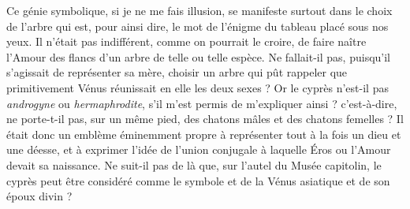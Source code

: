 \documentclass{article}
\begin{document}
Ce génie symbolique, si je ne me fais illusion, se manifeste surtout dans le choix de l'arbre qui est, pour ainsi dire, le mot de l'énigme du tableau placé sous nos yeux. Il n'était pas indifférent, comme on pourrait le croire, de faire naître l'Amour des flancs d'un arbre de telle ou telle espèce. Ne fallait-il pas, puisqu'il s'agissait de représenter sa mère, choisir un arbre qui pût rappeler que primitivement Vénus réunissait en elle les deux sexes ? Or le cyprès n'est-il pas \emph{androgyne} ou \emph{hermaphrodite}, s'il m'est permis de m'expliquer ainsi ? c'est-à-dire, ne porte-t-il pas, sur un même pied, des chatons mâles et des chatons femelles ? Il était donc un emblème éminemment propre à représenter tout à la fois un dieu et une déesse, et à exprimer l'idée de l'union conjugale à laquelle Éros ou l'Amour devait sa naissance. Ne suit-il pas de là que, sur l'autel du Musée capitolin, le cyprès peut être considéré comme le symbole et de la Vénus asiatique et de son époux divin ?
\end{document}
